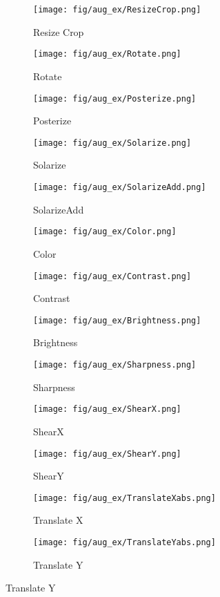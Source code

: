 \documentclass{article}
\begin{document}
\begin{figure}[!t]
  \begin{subfigure}[b]{0.16\linewidth}
          \texttt{[image: fig/aug\_ex/ResizeCrop.png]}
          \caption{Resize Crop}
  \end{subfigure}
  \begin{subfigure}[b]{0.16\linewidth}
          \texttt{[image: fig/aug\_ex/Rotate.png]}
          \caption{Rotate}
  \end{subfigure}
  \begin{subfigure}[b]{0.16\linewidth}
          \texttt{[image: fig/aug\_ex/Posterize.png]}
          \caption{Posterize}
  \end{subfigure}
  \begin{subfigure}[b]{0.16\linewidth}
          \texttt{[image: fig/aug\_ex/Solarize.png]}
          \caption{Solarize}
  \end{subfigure}
  \begin{subfigure}[b]{0.16\linewidth}
          \texttt{[image: fig/aug\_ex/SolarizeAdd.png]}
          \caption{SolarizeAdd}
  \end{subfigure}
  \begin{subfigure}[b]{0.16\linewidth}
          \texttt{[image: fig/aug\_ex/Color.png]}
          \caption{Color}
  \end{subfigure}
  \begin{subfigure}[b]{0.16\linewidth}
          \texttt{[image: fig/aug\_ex/Contrast.png]}
          \caption{Contrast}
  \end{subfigure}
  \begin{subfigure}[b]{0.16\linewidth}
          \texttt{[image: fig/aug\_ex/Brightness.png]}
          \caption{Brightness}
  \end{subfigure}
  \begin{subfigure}[b]{0.16\linewidth}
          \texttt{[image: fig/aug\_ex/Sharpness.png]}
          \caption{Sharpness}
  \end{subfigure}
  \begin{subfigure}[b]{0.16\linewidth}
          \texttt{[image: fig/aug\_ex/ShearX.png]}
          \caption{ShearX}
  \end{subfigure}
  \begin{subfigure}[b]{0.16\linewidth}
          \texttt{[image: fig/aug\_ex/ShearY.png]}
          \caption{ShearY}
  \end{subfigure}
  \begin{subfigure}[b]{0.16\linewidth}
          \texttt{[image: fig/aug\_ex/TranslateXabs.png]}
          \caption{Translate X}
  \end{subfigure}
  \begin{subfigure}[b]{0.16\linewidth}
          \texttt{[image: fig/aug\_ex/TranslateYabs.png]}
          \caption{Translate Y}
  \end{subfigure}
\end{figure}
\end{document}
